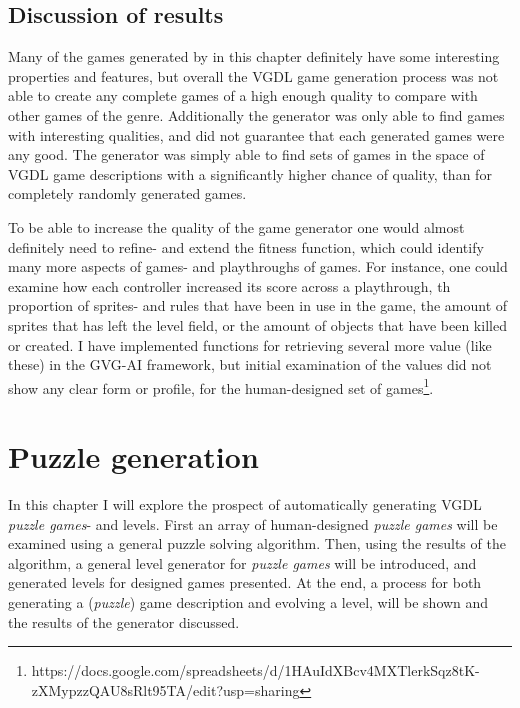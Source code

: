 \documentclass[a4paper,titlepage,final]{report}
\begin{document}



\section{Discussion of results}
\label{sec_task2discussion}
Many of the games generated by in this chapter definitely have some interesting properties and features, but overall the VGDL game generation process was not able to create any complete games of a high enough quality to compare with other games of the genre.
Additionally the generator was only able to find games with interesting qualities, and did not guarantee that each generated games were any good. 
The generator was simply able to find sets of games in the space of VGDL game descriptions with a significantly higher chance of quality, than for completely randomly generated games. 

To be able to increase the quality of the game generator one would almost definitely need to refine- and extend the fitness function, which could identify many more aspects of games- and playthroughs of games.
For instance, one could examine how each controller increased its score across a playthrough, th proportion of sprites- and rules that have been in use in the game, the amount of sprites that has left the level field, or the amount of objects that have been killed or created.
I have implemented functions for retrieving several more value (like these) in the GVG-AI framework, but initial examination of the values did not show any clear form or profile, for the human-designed set of games\footnote{https://docs.google.com/spreadsheets/d/1HAuIdXBcv4MXTlerkSqz8tK-zXMypzzQAU8sRlt95TA/edit?usp=sharing}.




\chapter{Puzzle generation}
\label{ch_task3}
In this chapter I will explore the prospect of automatically generating VGDL \textit{puzzle games}- and levels.
First an array of human-designed \textit{puzzle games} will be examined using a general puzzle solving algorithm.
Then, using the results of the algorithm, a general level generator for \textit{puzzle games} will be introduced, and generated levels for designed games presented.
At the end, a process for both generating a (\textit{puzzle}) game description and evolving a level, will be shown and the results of the generator discussed.
\end{document}

